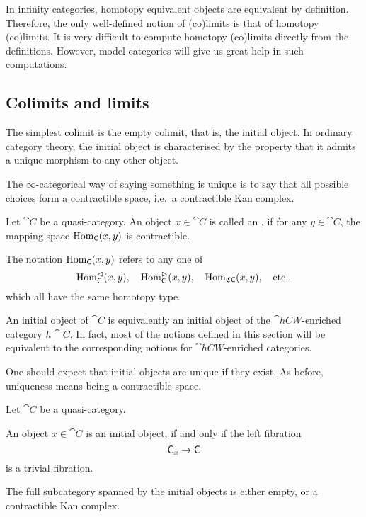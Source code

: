 In infinity categories,
homotopy equivalent objects are equivalent by definition.
Therefore, the only well-defined notion of (co)limits 
is that of homotopy (co)limits.
It is very difficult to compute homotopy (co)limits
directly from the definitions.
However, model categories will give us great help in such computations.

\subsection{Colimits and limits}

The simplest colimit is the empty colimit, that is, the initial object.
In ordinary category theory, the initial object is characterised by
the property that it admits a unique morphism to any other object.

The $\infty$-categorical way of saying something is unique 
is to say that all possible choices form a contractible space,
i.e.\ a contractible Kan complex.

\begin{definition}
    Let $\cat C$ be a quasi-category.
    An object $x\in\cat C$ is called an ,
    if for any $y\in\cat C$, the mapping space $\operatorname{Hom}_{\mathsf{C}}(x,y)$ is contractible.
\end{definition}

The notation $\operatorname{Hom}_{\mathsf{C}}(x,y)$ refers to any one of
\[\operatorname{Hom}_{\mathsf{C}}^\vartriangleleft(x,y),\quad
\operatorname{Hom}_{\mathsf{C}}^\vartriangleright(x,y),\quad 
\operatorname{Hom}_{\mathfrak C\mathsf{C}}(x,y),\quad\text{etc.,} \]
which all have the same homotopy type.

\begin{remark}
    An initial object of $\cat C$
    is equivalently an initial object of the $\cat{hCW}$-enriched category $h\cat C$.
    In fact, most of the notions defined in this section will be equivalent to 
    the corresponding notions for $\cat{hCW}$-enriched categories. \varqed
\end{remark}

One should expect that initial objects are unique if they exist.
As before, uniqueness means being a contractible space.

\begin{proposition}
    Let $\cat C$ be a quasi-category.
    \begin{itms}
        \item An object $x\in\cat C$ is an initial object, if and only if
        the left fibration
        \[ \mathsf{C}_{x\/}\to\mathsf{C} \]
        is a trivial fibration.
        \item The full subcategory spanned by the initial objects 
        is either empty, or a contractible Kan complex.
    \end{itms}
\end{proposition}

